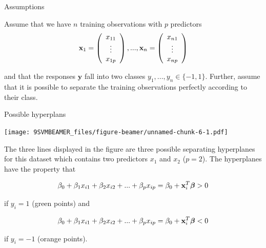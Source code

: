\documentclass[ignorenonframetext,]{beamer}
\begin{document}
\begin{frame}

\begin{block}{Assumptions}

Assume that we have \(n\) training observations with \(p\) predictors
\[{\bf x}_1=\left(
    \begin{array}{c}
      x_{11} \\
      \vdots \\
      x_{1p}
      \end{array}
  \right) ,..., {\bf x}_n=\left(
    \begin{array}{c}
      x_{n1} \\
      \vdots \\
      x_{np}
      \end{array}
  \right)\]

and that the responses \(\boldsymbol{y}\) fall into two classes
\(y_1,...,y_n \in \{-1,1\}\). Further, assume that it is possible to
separate the training observations perfectly according to their class.

\end{block}

\end{frame}

\begin{frame}

\begin{block}{Possible hyperplans}

\texttt{[image: 9SVMBEAMER\_files/figure-beamer/unnamed-chunk-6-1.pdf]}

\end{block}

\end{frame}

\begin{frame}

The three lines displayed in the figure are three possible separating
hyperplanes for this dataset which contains two predictors \(x_1\) and
\(x_2\) (\(p=2\)). The hyperplanes have the property that

\[\beta_0+\beta_1 x_{i1} + \beta_2 x_{i2}+...+\beta_p x_{ip}=\beta_0+{\bf x}_i^T {\boldsymbol \beta}>0\]

if \(y_i=1\) (green points) and

\[\beta_0+\beta_1 x_{i1} + \beta_2 x_{i2}+...+\beta_p x_{ip}=\beta_0+{\bf x}_i^T {\boldsymbol \beta}<0\]

if \(y_i=-1\) (orange points).

\end{frame}
\end{document}
